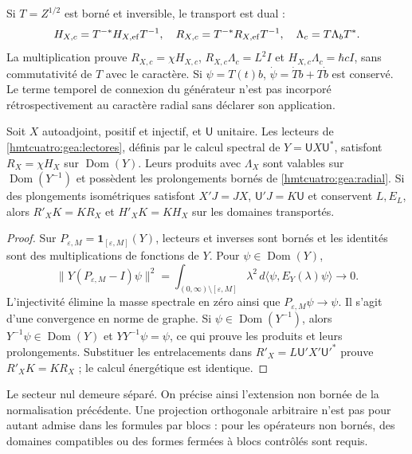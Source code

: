 Si $T=Z^{1/2}$ est borné et inversible, le transport est dual :
\begin{equation}
H_{X,c}=T^{-*}H_{X,\rm ef}T^{-1},\quad
R_{X,c}=T^{-*}R_{X,\rm ef}T^{-1},\quad
\Lambda_c=T\Lambda_bT^*.
\label{hmtcuatro:gea:dual}
\end{equation}
La multiplication prouve $R_{X,c}=\chi H_{X,c}$, $R_{X,c}\Lambda_c=L^2I$ et $H_{X,c}\Lambda_c=\hbar cI$, sans commutativité de $T$ avec le caractère. Si $\psi=T(t)b$, $\dot\psi=\dot Tb+T\dot b$ est conservé. Le terme temporel de connexion du générateur n’est pas incorporé rétrospectivement au caractère radial sans déclarer son application.

\begin{proposition}
\label{hmtcuatro:gea:limite} Soit $X$ autoadjoint, positif et injectif, et $\mathsf U$ unitaire. Les lecteurs de \eqref{hmtcuatro:gea:lectores}, définis par le calcul spectral de $Y=\mathsf UX\mathsf U^*$, satisfont $R_X=\chi H_X$ sur $\operatorname{Dom}(Y)$. Leurs produits avec $\Lambda_X$ sont valables sur $\operatorname{Dom}(Y^{-1})$ et possèdent les prolongements bornés de \eqref{hmtcuatro:gea:radial}. Si des plongements isométriques satisfont $X'J=JX$, $\mathsf U'J=K\mathsf U$ et conservent $L,E_L$, alors $R'_XK=KR_X$ et $H'_XK=KH_X$ sur les domaines transportés.
\end{proposition}
\begin{proof}
Sur $P_{\varepsilon,M}=\mathbf1_{[\varepsilon,M]}(Y)$, lecteurs et inverses sont bornés et les identités sont des multiplications de fonctions de $Y$. Pour $\psi\in\operatorname{Dom}(Y)$,
\[
\|Y(P_{\varepsilon,M}-I)\psi\|^2
=\int_{(0,\infty)\setminus[\varepsilon,M]}
\lambda^2\,d\langle\psi,E_Y(\lambda)\psi\rangle\longrightarrow0.
\]
L’injectivité élimine la masse spectrale en zéro ainsi que $P_{\varepsilon,M}\psi\to\psi$. Il s’agit d’une convergence en norme de graphe. Si $\psi\in\operatorname{Dom}(Y^{-1})$, alors $Y^{-1}\psi\in\operatorname{Dom}(Y)$ et $YY^{-1}\psi=\psi$, ce qui prouve les produits et leurs prolongements. Substituer les entrelacements dans $R'_X=L\mathsf U'X'\mathsf U'^*$ prouve $R'_XK=KR_X$ ; le calcul énergétique est identique.
\end{proof}
Le secteur nul demeure séparé. On précise ainsi l’extension non bornée de la normalisation précédente. Une projection orthogonale arbitraire n’est pas pour autant admise dans les formules par blocs : pour les opérateurs non bornés, des domaines compatibles ou des formes fermées à blocs contrôlés sont requis.


